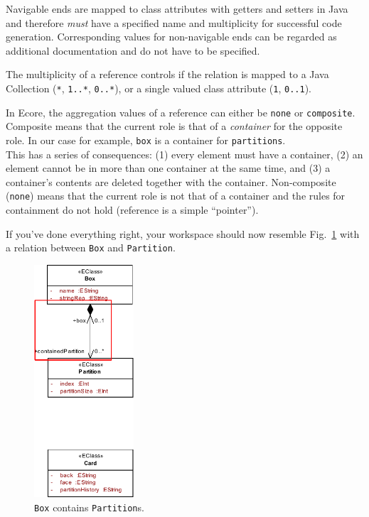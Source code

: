 Navigable ends are mapped to class attributes with getters and setters in Java and therefore \emph{must} have a specified name and  multiplicity for successful code generation.
Corresponding values for non-navigable ends can  be regarded as additional documentation and do not have to be specified.

The multiplicity of a reference controls if the relation is mapped to a Java Collection (\texttt{*},  \texttt{1..*}, \texttt{0..*}), or a single valued class attribute (\texttt{1}, \texttt{0..1}).

In Ecore, the aggregation values of a reference can either be \texttt{none} or \texttt{com\-po\-site}.
Composite means that the current role is that of a \emph{container} for the opposite role.
In our case for example, \texttt{box} is a container for \texttt{partitions}.\\
This has a series of consequences: (1) every element must have a container, (2) an element cannot be in more than one container at the same time, and (3) a container's contents are deleted together with the container.
Non-composite (\texttt{none}) means that the current role is not that of a container and the rules for containment do not hold (reference is a simple ``pointer'').

If you've done everything right, your workspace should now resemble Fig.~\ref{fig:ereference_completed} with a relation between \texttt{Box} and \texttt{Partition}.

\begin{figure}[htbp]
	\centering
  \includegraphics[width=0.33\textwidth]{pics/memBoxBilder/memBox28.pdf}
	\caption{\texttt{Box} contains \texttt{Partition}s.}
	\label{fig:ereference_completed}
\end{figure}
\FloatBarrier

